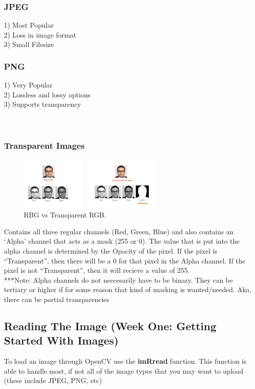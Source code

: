 \documentclass[fleqn]{article}
\begin{document}
    \subsubsection{JPEG}
    1) Most Popular\\
    2) Loss in image format\\
    3) Small Filesize
    \subsubsection{PNG}
    1) Very Popular\\
    2) Lossless and lossy options\\
    3) Supports transparency\\ \\ \\
    \subsubsection{Transparent Images}

    \begin{figure}
    \centering
    \includegraphics[width=200pt]{Transparentimage.png}
    \caption{\label{fig:Transparentimage}RBG vs Transparent RGB.}
    \end{figure}
    Contains all three regular channels (Red, Green, Blue) and also contains an `Alpha' channel that acts as a mask (255 or 0). The value that is put into the alpha channel is determined by the Opacity of the pixel. If the pixel is ``Transparent'', then there will be a 0 for that pixel in the Alpha channel. If the pixel is not ``Transparent'', then it will recieve a value of 255.\\
    ***Note: Alpha channels do not neccesarily have to be binary. They can be tertiary or higher if for some reason that kind of masking is wanted/needed. Aka, there can be partial transparencies

    \subsection{Reading The Image (Week One: Getting Started With Images)}
    To load an image through OpenCV use the \textbf{imRread} function. This function is able to handle most, if not all of the image types that you may want to upload (these include JPEG, PNG, etc)
\end{document}
